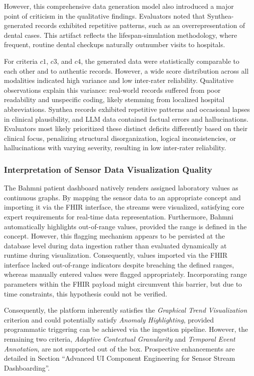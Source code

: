 However, this comprehensive data generation model also introduced a major point of criticism in the qualitative findings. Evaluators noted that Synthea-generated records exhibited repetitive patterns, such as an overrepresentation of dental cases. This artifact reflects the lifespan-simulation methodology, where frequent, routine dental checkups naturally outnumber visits to hospitals.

For criteria $c1$, $c3$, and $c4$, the generated data were statistically comparable to each other and to authentic records. However, a wide score distribution across all modalities indicated high variance and low inter-rater reliability. Qualitative observations explain this variance: real-world records suffered from poor readability and unspecific coding, likely stemming from localized hospital abbreviations. Synthea records exhibited repetitive patterns and occasional lapses in clinical plausibility, and LLM data contained factual errors and hallucinations. Evaluators most likely prioritized these distinct deficits differently based on their clinical focus, penalizing structural disorganization, logical inconsistencies, or hallucinations with varying severity, resulting in low inter-rater reliability.

\subsubsection{Interpretation of Sensor Data Visualization Quality}
The Bahmni patient dashboard natively renders assigned laboratory values as continuous graphs. By mapping the sensor data to an appropriate concept and importing it via the FHIR interface, the streams were visualized, satisfying core expert requirements for real-time data representation. Furthermore, Bahmni automatically highlights out-of-range values, provided the range is defined in the concept. However, this flagging mechanism appears to be persisted at the database level during data ingestion rather than evaluated dynamically at runtime during visualization. Consequently, values imported via the FHIR interface lacked out-of-range indicators despite breaching the defined ranges, whereas manually entered values were flagged appropriately. Incorporating range parameters within the FHIR payload might circumvent this barrier, but due to time constraints, this hypothesis could not be verified.

Consequently, the platform inherently satisfies the \textit{Graphical Trend Visualization} criterion and could potentially satisfy \textit{Anomaly Highlighting}, provided programmatic triggering can be achieved via the ingestion pipeline. However, the remaining two criteria, \textit{Adaptive Contextual Granularity} and \textit{Temporal Event Annotation}, are not supported out of the box. Prospective enhancements are detailed in Section \enquote{Advanced UI Component Engineering for Sensor Stream Dashboarding}.

